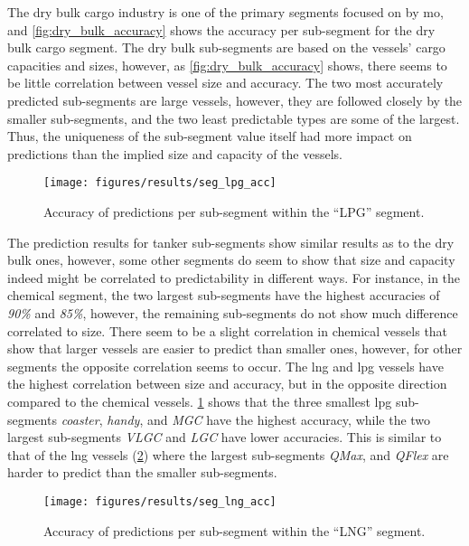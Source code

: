 The dry bulk cargo industry is one of the primary segments focused on by \acrshort{mo}, and \cref{fig:dry_bulk_accuracy} shows the accuracy per sub-segment for the dry bulk cargo segment. The dry bulk sub-segments are based on the vessels' cargo capacities and sizes, however, as \cref{fig:dry_bulk_accuracy} shows, there seems to be little correlation between vessel size and accuracy. The two most accurately predicted sub-segments are large vessels, however, they are followed closely by the smaller sub-segments, and the two least predictable types are some of the largest. Thus, the uniqueness of the sub-segment value itself had more impact on predictions than the implied size and capacity of the vessels.

\begin{figure}[htbp]
    \centering
    \texttt{[image: figures/results/seg\_lpg\_acc]}
    \caption{Accuracy of predictions per sub-segment within the ``LPG'' segment.}
    \label{fig:lpg_accuracy}
\end{figure}

The prediction results for tanker sub-segments show similar results as to the dry bulk ones, however, some other segments do seem to show that size and capacity indeed might be correlated to predictability in different ways. For instance, in the chemical segment, the two largest sub-segments have the highest accuracies of \textit{90\%} and \textit{85\%}, however, the remaining sub-segments do not show much difference correlated to size. There seem to be a slight correlation in chemical vessels that show that larger vessels are easier to predict than smaller ones, however, for other segments the opposite correlation seems to occur. The \acrfull{lng} and \acrfull{lpg} vessels have the highest correlation between size and accuracy, but in the opposite direction compared to the chemical vessels. \cref{fig:lpg_accuracy} shows that the three smallest \acrshort{lpg} sub-segments \textit{coaster}, \textit{handy}, and \textit{MGC} have the highest accuracy, while the two largest sub-segments \textit{VLGC} and \textit{LGC}  have lower accuracies. This is similar to that of the \acrshort{lng} vessels (\cref{fig:lng_accuracy}) where the largest sub-segments \textit{QMax}, and \textit{QFlex} are harder to predict than the smaller sub-segments.

\begin{figure}[htbp]
    \centering
    \texttt{[image: figures/results/seg\_lng\_acc]}
    \caption{Accuracy of predictions per sub-segment within the ``LNG'' segment.}
    \label{fig:lng_accuracy}
\end{figure}

